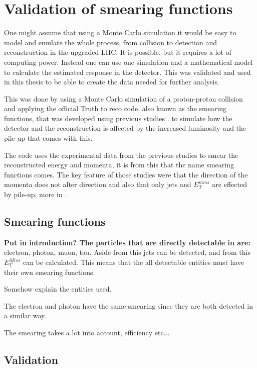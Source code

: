 \chapter{Validation of smearing functions}\label{cha:vali}
One might assume that using a Monte Carlo simulation it would be easy to model and emulate the whole process, from collision to detection and reconstruction in the upgraded LHC. It is possible, but it requires a lot of computing power. Instead one can use one simulation and a mathematical model to calculate the estimated response in the detector. This was validated and used in this thesis to be able to create the data needed for further analysis. 

This was done by using a Monte Carlo simulation of a proton-proton collision and applying the official Truth to reco code, also known as the smearing functions, that was developed using previous studies \citep{ATLAS:LOI2, ATL-PHYS-PUB-2013-004}. to simulate how the detector and the reconstruction is affected by the increased luminosity and the pile-up that comes with this.

The code uses the experimental data from the previous studies to smear the reconstructed energy and momenta, it is from this that the name smearing functions comes.
The key feature of those studies were that the direction of the momenta does not alter direction and also that only jets and $E^{miss}_T$ are effected by pile-up, more in .

\newpage
\section{Smearing functions}\label{sec:smear}
\textbf{Put in introduction? The particles that are directly detectable in \abbrATLAS are:} electron, photon, muon, tau. Aside from this jets can be detected, and from this $E_T^{Miss}$ can be calculated. This means that the all detectable entities must have their own smearing functions.

Somehow explain the entities used.

The electron and photon have the same smearing since they are both detected in a similar way. 

The smearing takes a lot into account, efficiency etc...

\section{Validation}\label{sec:vali}
